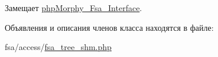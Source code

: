 Замещает \hyperlink{interfacephpMorphy__Fsa__Interface_a6e249e8e54705e4c1d9399ff0e491ce0}{phpMorphy\_\-Fsa\_\-Interface}.



Объявления и описания членов класса находятся в файле:\begin{DoxyCompactItemize}
\item 
fsa/access/\hyperlink{fsa__tree__shm_8php}{fsa\_\-tree\_\-shm.php}\end{DoxyCompactItemize}
